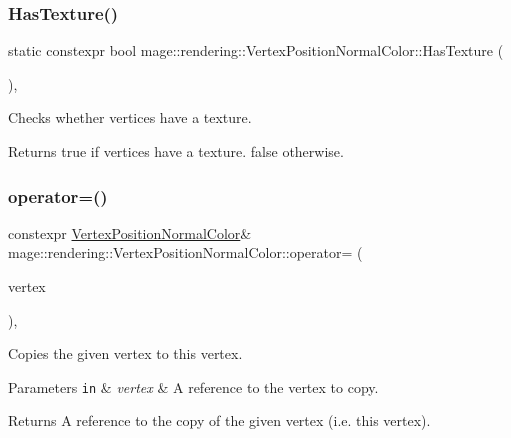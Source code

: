 \subsubsection{\texorpdfstring{Has\+Texture()}{HasTexture()}}
{\footnotesize\ttfamily static constexpr bool mage\+::rendering\+::\+Vertex\+Position\+Normal\+Color\+::\+Has\+Texture (\begin{DoxyParamCaption}{ }\end{DoxyParamCaption})\hspace{0.3cm}{\ttfamily [static]}, {\ttfamily [noexcept]}}

Checks whether vertices have a texture.

\begin{DoxyReturn}{Returns}
{\ttfamily true} if vertices have a texture. {\ttfamily false} otherwise. 
\end{DoxyReturn}
\hypertarget{structmage_1_1rendering_1_1_vertex_position_normal_color_ae3bdf697f0dae8b01b43c6a8249ee817}{}\label{structmage_1_1rendering_1_1_vertex_position_normal_color_ae3bdf697f0dae8b01b43c6a8249ee817} 
\subsubsection{\texorpdfstring{operator=()}{operator=()}\hspace{0.1cm}{\footnotesize\ttfamily [1/2]}}
{\footnotesize\ttfamily constexpr \hyperlink{structmage_1_1rendering_1_1_vertex_position_normal_color}{Vertex\+Position\+Normal\+Color}\& mage\+::rendering\+::\+Vertex\+Position\+Normal\+Color\+::operator= (\begin{DoxyParamCaption}\item[{const \hyperlink{structmage_1_1rendering_1_1_vertex_position_normal_color}{Vertex\+Position\+Normal\+Color} \&}]{vertex }\end{DoxyParamCaption})\hspace{0.3cm}{\ttfamily [default]}, {\ttfamily [noexcept]}}

Copies the given vertex to this vertex.


\begin{DoxyParams}[1]{Parameters}
\mbox{\tt in}  & {\em vertex} & A reference to the vertex to copy. \\
\hline
\end{DoxyParams}
\begin{DoxyReturn}{Returns}
A reference to the copy of the given vertex (i.\+e. this vertex). 
\end{DoxyReturn}
\hypertarget{structmage_1_1rendering_1_1_vertex_position_normal_color_a2528c797701a7102e6895d5c5d04cf27}{}\label{structmage_1_1rendering_1_1_vertex_position_normal_color_a2528c797701a7102e6895d5c5d04cf27} 
